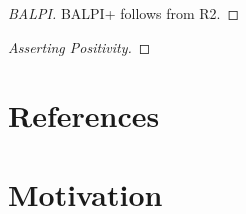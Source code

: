 \documentclass[preprint,leqno]{elsarticle}
\begin{document}
\begin{proof}[BALPI]

BALPI+ follows from R2.

\end{proof}


\begin{proof}[Asserting Positivity]

\end{proof}

\section*{References}





\section{Motivation}
\end{document}
